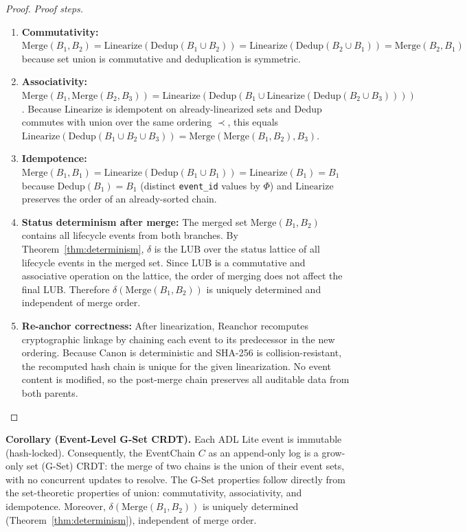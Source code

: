 \begin{proof}
\emph{Proof steps.}
\begin{enumerate}[label=Step~\arabic*:,leftmargin=2em]
    \item \textbf{Commutativity:} $\text{Merge}(B_1, B_2) = \text{Linearize}(\text{Dedup}(B_1 \cup B_2)) = \text{Linearize}(\text{Dedup}(B_2 \cup B_1)) = \text{Merge}(B_2, B_1)$ because set union is commutative and deduplication is symmetric.
    \item \textbf{Associativity:} $\text{Merge}(B_1, \text{Merge}(B_2, B_3)) = \text{Linearize}(\text{Dedup}(B_1 \cup \text{Linearize}(\text{Dedup}(B_2 \cup B_3))))$. Because $\text{Linearize}$ is idempotent on already-linearized sets and $\text{Dedup}$ commutes with union over the same ordering $\prec$, this equals $\text{Linearize}(\text{Dedup}(B_1 \cup B_2 \cup B_3)) = \text{Merge}(\text{Merge}(B_1, B_2), B_3)$.
    \item \textbf{Idempotence:} $\text{Merge}(B_1, B_1) = \text{Linearize}(\text{Dedup}(B_1 \cup B_1)) = \text{Linearize}(B_1) = B_1$ because $\text{Dedup}(B_1) = B_1$ (distinct \texttt{event\_id} values by $\Phi$) and $\text{Linearize}$ preserves the order of an already-sorted chain.
    \item \textbf{Status determinism after merge:} The merged set $\text{Merge}(B_1, B_2)$ contains all lifecycle events from both branches. By Theorem~\ref{thm:determinism}, $\delta$ is the LUB over the status lattice of all lifecycle events in the merged set. Since LUB is a commutative and associative operation on the lattice, the order of merging does not affect the final LUB. Therefore $\delta(\text{Merge}(B_1, B_2))$ is uniquely determined and independent of merge order.
    \item \textbf{Re-anchor correctness:} After linearization, $\text{Reanchor}$ recomputes cryptographic linkage by chaining each event to its predecessor in the new ordering. Because $\text{Canon}$ is deterministic and SHA-256 is collision-resistant, the recomputed hash chain is unique for the given linearization. No event content is modified, so the post-merge chain preserves all auditable data from both parents.
\end{enumerate}
\end{proof}

\textbf{Corollary (Event-Level G-Set CRDT).} Each ADL Lite event is immutable (hash-locked). Consequently, the EventChain $C$ as an append-only log is a grow-only set (G-Set) CRDT: the merge of two chains is the union of their event sets, with no concurrent updates to resolve. The G-Set properties follow directly from the set-theoretic properties of union: commutativity, associativity, and idempotence. Moreover, $\delta(\text{Merge}(B_1, B_2))$ is uniquely determined (Theorem~\ref{thm:determinism}), independent of merge order.

